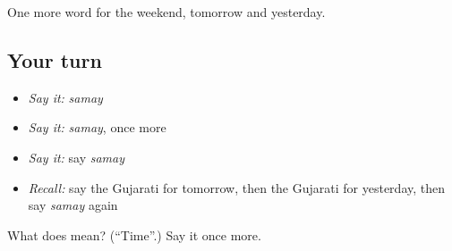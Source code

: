 \begin{grammarlens}[title={What you've built}]
One more word for the weekend, tomorrow and yesterday.
\end{grammarlens}

\subsection*{Your turn}
\begin{itemize}
\raggedright
  \item \emph{Say it:} \emph{samay}
  \item \emph{Say it:} \emph{samay}, once more
  \item \emph{Say it:} say \emph{samay}
  \item \emph{Recall:} say the Gujarati for tomorrow, then the Gujarati for yesterday, then say \emph{samay} again
\end{itemize}

\begin{tcolorbox}[breakable,colback=teal!4,colframe=teal!35!black,title={Before you move on}]
What does  mean? (\textquotedblleft{}Time\textquotedblright{}.) Say it once more.
\end{tcolorbox}

